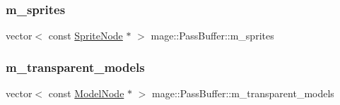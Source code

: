 \hypertarget{structmage_1_1_pass_buffer_ad742ad6712a63e9d58621da83a7fb900}{}\label{structmage_1_1_pass_buffer_ad742ad6712a63e9d58621da83a7fb900} 
\subsubsection{\texorpdfstring{m\+\_\+sprites}{m\_sprites}}
{\footnotesize\ttfamily vector$<$ const \hyperlink{classmage_1_1_sprite_node}{Sprite\+Node} $\ast$ $>$ mage\+::\+Pass\+Buffer\+::m\+\_\+sprites}

\hypertarget{structmage_1_1_pass_buffer_a6af414efd72ef39b1af84951e56b7860}{}\label{structmage_1_1_pass_buffer_a6af414efd72ef39b1af84951e56b7860} 
\subsubsection{\texorpdfstring{m\+\_\+transparent\+\_\+models}{m\_transparent\_models}}
{\footnotesize\ttfamily vector$<$ const \hyperlink{classmage_1_1_model_node}{Model\+Node} $\ast$ $>$ mage\+::\+Pass\+Buffer\+::m\+\_\+transparent\+\_\+models}

